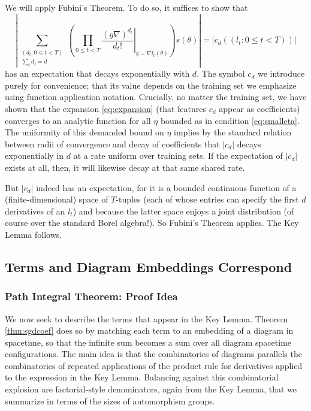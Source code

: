 \documentclass{article}
\newcommand{\wrap}[1]{\left(#1\right)}
\newcommand{\wabs}[1]{\left|#1\right|}
\begin{document}
            We will apply Fubini's Theorem.  To do so, it suffices to show that   
            $$
                \wabs{
                    \sum_{\substack{(d_t: 0\leq t<T) \\ \sum_t d_t = d}}
                    \wrap{
                        \prod_{0 \leq t < T} \left.
                            \frac{(g \nabla)^{d_t}}{d_t!}
                        \right|_{g=\nabla l_t(\theta)}
                    } s (\theta)
                }
                = \wabs{c_d((l_t: 0\leq t<T))} 
            $$
            has an expectation that decays exponentially with $d$.  The symbol
            $c_d$ we introduce purely for convenience; that its value depends
            on the training set we emphasize using function application
            notation.  Crucially, no matter the training set, we have shown
            that the expansion \ref{eq:expansion} (that features $c_d$ appear
            as coefficients) converges to an analytic function for all $\eta$
            bounded as in condition \ref{eq:smalleta}.  The uniformity of this
            demanded bound on $\eta$ implies by the standard relation between
            radii of convergence and decay of coefficients that $\wabs{c_d}$
            decays exponentially in $d$ at a rate uniform over training sets.
            If the expectation of $\wabs{c_d}$ exists at all, then, it will
            likewise decay at that same shared rate.
            
            But $\wabs{c_d}$ indeed has an expectation, for it is a bounded
            continuous function of a (finite-dimensional) space of $T$-tuples
            (each of whose entries can specify the first $d$ derivatives of an
            $l_t$) and because the latter space enjoys a joint distribution (of
            course over the standard Borel algebra!).  So Fubini's Theorem
            applies. The Key Lemma
            follows.   

    \subsection*{Terms and Diagram Embeddings Correspond}
        \subsubsection*{Path Integral Theorem: Proof Idea}
            We now seek to describe the terms that appear in the Key Lemma. 
            Theorem \ref{thm:sgdcoef} does so by matching each term to an
            embedding of a diagram in spacetime, so that the infinite sum
            becomes a sum over all diagram spacetime configurations.
            The main idea is that the combinatorics of diagrams parallels the
            combinatorics of repeated applications of the product rule for
            derivatives applied to the expression in the Key Lemma. 
            Balancing against this combinatorial explosion are factorial-style 
            denominators, again from the Key Lemma, that we summarize in terms
            of the sizes of automorphism groups.
\end{document}
